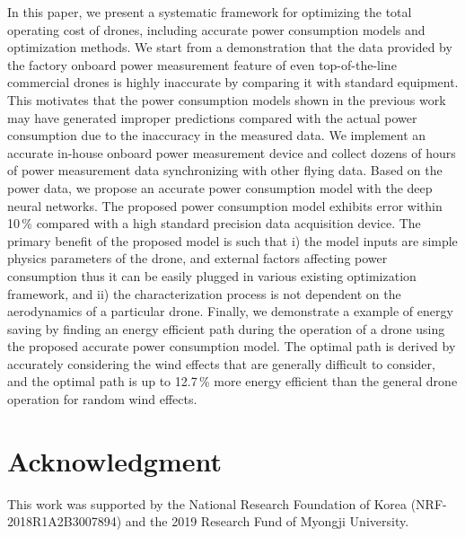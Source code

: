 \documentclass[journal]{./template/IEEEtran}
\begin{document}
In this paper, we present a systematic framework for optimizing the total operating cost of drones, including accurate power consumption models and optimization methods.
We start from a demonstration that the data provided by the factory onboard power measurement feature of even top-of-the-line commercial drones is highly inaccurate by comparing it with standard equipment. 
This motivates that the power consumption models shown in the previous work may have generated improper predictions compared with the actual power consumption due to the inaccuracy in the measured data.
We implement an accurate in-house onboard power measurement device and collect dozens of hours of power measurement data synchronizing with other flying data. 
Based on the power data, we propose an accurate power consumption model with the deep neural networks. 
The proposed power consumption model exhibits error within 10\,\% compared with a high standard precision data acquisition device. 
The primary benefit of the proposed model is such that i) the model inputs are simple physics parameters of the drone, and external factors affecting power consumption thus it can be easily plugged in various existing optimization framework, and ii) the characterization process is not dependent on the aerodynamics of a particular drone. %
Finally, we demonstrate a example of energy saving by finding an energy efficient path during the operation of a drone using the proposed accurate power consumption model. The optimal path is derived by accurately considering the wind effects that are generally difficult to consider, and the optimal path is up to 12.7\,\% more energy efficient than the general drone operation for random wind effects.










\section*{Acknowledgment}
This work was supported by the National Research Foundation of Korea (NRF-2018R1A2B3007894) and the 2019 Research Fund of Myongji University. 


\end{document}
